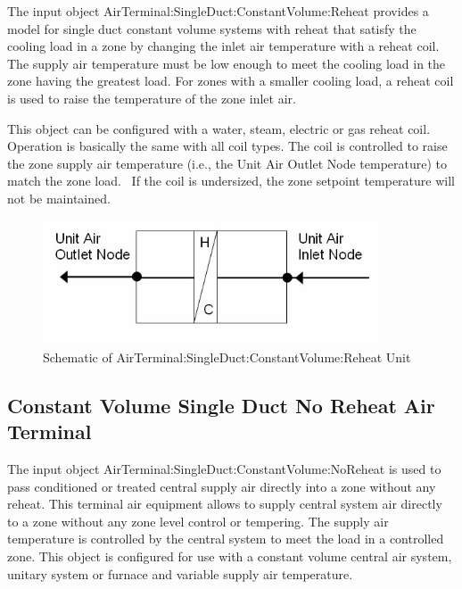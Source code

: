 The input object AirTerminal:SingleDuct:ConstantVolume:Reheat provides a model for single duct constant volume systems with reheat that satisfy the cooling load in a zone by changing the inlet air temperature with a reheat coil. The supply air temperature must be low enough to meet the cooling load in the zone having the greatest load. For zones with a smaller cooling load, a reheat coil is used to raise the temperature of the zone inlet air.

This object can be configured with a water, steam, electric or gas reheat coil. Operation is basically the same with all coil types. The coil is controlled to raise the zone supply air temperature (i.e., the Unit Air Outlet Node temperature) to match the zone load.~ If the coil is undersized, the zone setpoint temperature will not be maintained.

\begin{figure}[hbtp] %
\centering
\includegraphics[width=0.9\textwidth, height=0.9\textheight, keepaspectratio=true]{media/image2788.png}
\caption{Schematic of AirTerminal:SingleDuct:ConstantVolume:Reheat Unit \protect \label{fig:schematic-of-airterminal-singleduct1}}
\end{figure}


\subsection{Constant Volume Single Duct No Reheat Air Terminal}\label{constant-volume-single-duct-no-reheat-air-terminal}

The input object AirTerminal:SingleDuct:ConstantVolume:NoReheat is used to pass conditioned or treated central supply air directly into a zone without any reheat. This terminal air equipment allows to supply central system air directly to a zone without any zone level control or tempering. The supply air temperature is controlled by the central system to meet the load in a controlled zone. This object is configured for use with a constant volume central air system, unitary system or furnace and variable supply air temperature. 

